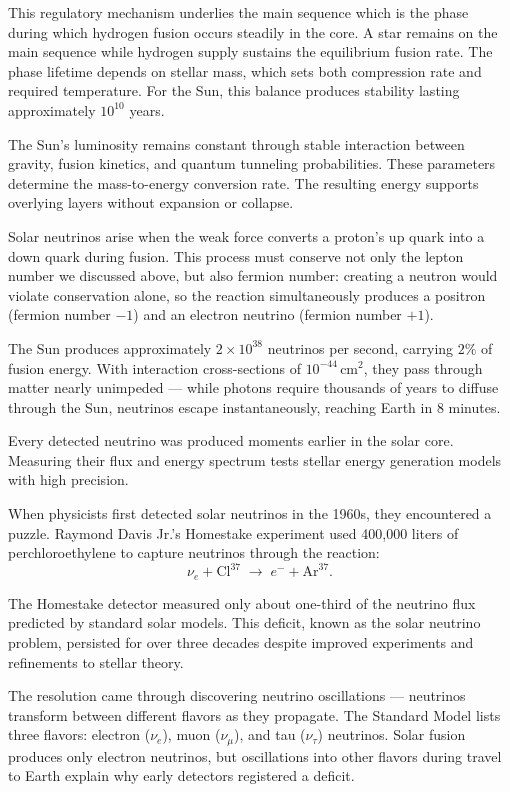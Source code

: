 This regulatory mechanism underlies the main sequence which is the phase during which hydrogen fusion occurs steadily in the core. A star remains on the main sequence while hydrogen supply sustains the equilibrium fusion rate. The phase lifetime depends on stellar mass, which sets both compression rate and required temperature. For the Sun, this balance produces stability lasting approximately $10^{10}$ years.

The Sun's luminosity remains constant through stable interaction between gravity, fusion kinetics, and quantum tunneling probabilities. These parameters determine the mass-to-energy conversion rate. The resulting energy supports overlying layers without expansion or collapse.

Solar neutrinos arise when the weak force converts a proton's up quark into a down quark during fusion. This process must conserve not only the lepton number we discussed above, but also fermion number: creating a neutron would violate conservation alone, so the reaction simultaneously produces a positron (fermion number $-1$) and an electron neutrino (fermion number $+1$).

The Sun produces approximately $2 \times 10^{38}$ neutrinos per second, carrying $2\%$ of fusion energy. With interaction cross-sections of $10^{-44}\,\text{cm}^2$, they pass through matter nearly unimpeded — while photons require thousands of years to diffuse through the Sun, neutrinos escape instantaneously, reaching Earth in 8 minutes.

Every detected neutrino was produced moments earlier in the solar core. Measuring their flux and energy spectrum tests stellar energy generation models with high precision.

When physicists first detected solar neutrinos in the 1960s, they encountered a puzzle. Raymond Davis Jr.'s Homestake experiment used 400,000 liters of perchloroethylene to capture neutrinos through the reaction:
\[
\nu_e + \text{Cl}^{37} \;\to\; e^- + \text{Ar}^{37}.
\]

The Homestake detector measured only about one-third of the neutrino flux predicted by standard solar models. This deficit, known as the solar neutrino problem, persisted for over three decades despite improved experiments and refinements to stellar theory.

The resolution came through discovering neutrino oscillations — neutrinos transform between different flavors as they propagate. The Standard Model lists three flavors: electron ($\nu_e$), muon ($\nu_\mu$), and tau ($\nu_\tau$) neutrinos. Solar fusion produces only electron neutrinos, but oscillations into other flavors during travel to Earth explain why early detectors registered a deficit.

